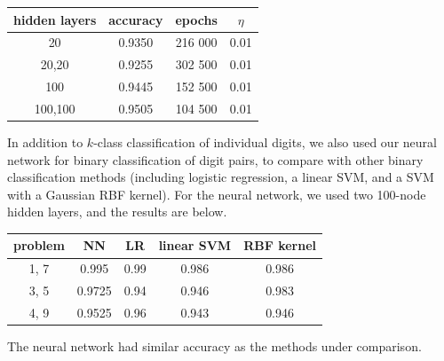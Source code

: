 \documentclass{article}
\begin{document}
\begin{multicols}{2}


\begin{center}
    \begin{tabular}{c|c|c|c}
        hidden layers & accuracy	& epochs & $\eta$ \\\hline
        20		& 0.9350 	& 216 000 	& 0.01\\
        20,20	& 0.9255 	& 302 500 	& 0.01\\
        100		& 0.9445 	& 152 500 	& 0.01 \\
        100,100	& 0.9505 	& 104 500 	& 0.01
    \end{tabular}
\end{center}









In addition to $k$-class classification of individual digits,
we also used our neural network for binary classification of digit pairs,
to compare with other binary classification methods
(including logistic regression, a linear SVM,
and a SVM with a Gaussian RBF kernel).
For the neural network, we used two 100-node hidden layers,
and the results are below.

\begin{center}
    \begin{tabular}{c|c|c|c|c}
        problem		& NN	& LR		& linear SVM	& RBF kernel \\\hline
        1, 7 & 0.995 	& 0.99 	& 0.986		& 0.986 \\
        3, 5 & 0.9725 	& 0.94 	& 0.946		& 0.983 \\
        4, 9 & 0.9525 	& 0.96 	& 0.943 		& 0.946 \\
    \end{tabular}
\end{center}
The neural network had similar accuracy as the methods under comparison.


\end{multicols}
\end{document}
